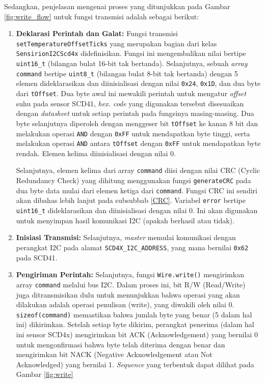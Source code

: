         Sedangkan, penjelasan mengenai proses yang ditunjukkan pada Gambar \ref{fig:write_flow} untuk fungsi transmisi adalah sebagai berikut:
        
        \begin{enumerate}
            \item \textbf{Deklarasi Perintah dan Galat:} Fungsi transmisi \texttt{setTemperatureOffsetTicks} yang merupakan bagian dari kelas \texttt{SensirionI2CScd4x} didefinisikan. Fungsi ini mengembalikan nilai bertipe \texttt{uint16\_t} (bilangan bulat 16-bit tak bertanda). Selanjutnya, sebuah \textit{array} \texttt{command} bertipe \texttt{uint8\_t} (bilangan bulat 8-bit tak bertanda) dengan 5 elemen dideklarasikan dan diinisialisasi dengan nilai \texttt{0x24}, \texttt{0x1D}, dan dua byte dari \texttt{tOffset}. Dua byte awal ini mewakili perintah untuk mengatur \textit{offset} suhu pada sensor SCD41, \textit{hex. code} yang digunakan tersebut disesuaikan dengan \textit{datasheet} untuk setiap perintah pada fungsinya masing-masing. Dua byte selanjutnya diperoleh dengan menggeser bit \texttt{tOffset} ke kanan 8 bit dan melakukan operasi \texttt{AND} dengan \texttt{0xFF} untuk mendapatkan byte tinggi, serta melakukan operasi \texttt{AND} antara \texttt{tOffset} dengan \texttt{0xFF} untuk mendapatkan byte rendah. Elemen kelima diinisialisasi dengan nilai 0.

            Selanjutnya, elemen kelima dari array \texttt{command} diisi dengan nilai CRC (Cyclic Redundancy Check) yang dihitung menggunakan fungsi \texttt{generateCRC} pada dua byte data mulai dari elemen ketiga dari \texttt{command}. Fungsi CRC ini sendiri akan dibahas lebih lanjut pada subsubbab \ref{CRC}. Variabel \texttt{error} bertipe \texttt{uint16\_t} dideklarasikan dan diinisialisasi dengan nilai 0. Ini akan digunakan untuk menyimpan hasil komunikasi I2C (apakah berhasil atau tidak).
            
            \item \textbf{Inisiasi Transmisi:} Selanjutnya, \textit{master} memulai komunikasi dengan perangkat I2C pada alamat \texttt{SCD4X\_I2C\_ADDRESS}, yang mana bernilai \texttt{0x62} pada SCD41. 

            \item \textbf{Pengiriman Perintah: }Selanjutnya, fungsi \texttt{Wire.write()} mengirimkan array \texttt{command} melalui bus I2C. Dalam proses ini, bit R/W (Read/Write) juga ditransmisikan dulu untuk menunjukkan bahwa operasi yang akan dilakukan adalah operasi penulisan (write), yang diwakili oleh nilai 0. \texttt{sizeof(command)} memastikan bahwa jumlah byte yang benar (5 dalam hal ini) dikirimkan. Setelah setiap byte dikirim, perangkat penerima (dalam hal ini sensor SCD4x) mengirimkan bit ACK (Acknowledgement) yang bernilai 0 untuk mengonfirmasi bahwa byte telah diterima dengan benar dan mengirimkan bit NACK (Negative Acknowledgement atau Not Acknowledged) yang bernilai 1. \textit{Sequence} yang terbentuk dapat dilihat pada Gambar \ref{fig:write} 


\end{enumerate}
